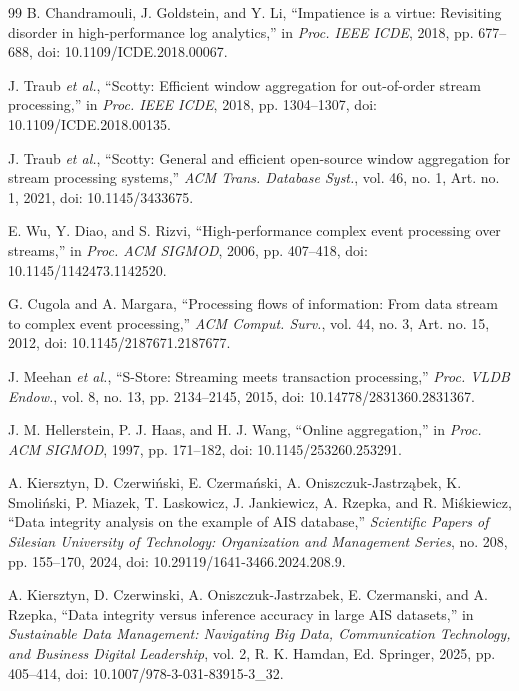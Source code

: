 \documentclass[conference]{IEEEtran}
\begin{document}
\begin{thebibliography}{99}
B. Chandramouli, J. Goldstein, and Y. Li,
``Impatience is a virtue: Revisiting disorder in high-performance log analytics,'' in \emph{Proc. IEEE ICDE}, 2018, pp. 677--688, doi: 10.1109/ICDE.2018.00067.

J. Traub \emph{et al.}, ``Scotty: Efficient window aggregation for out-of-order stream processing,'' in \emph{Proc. IEEE ICDE}, 2018, pp. 1304--1307, doi: 10.1109/ICDE.2018.00135.

J. Traub \emph{et al.}, ``Scotty: General and efficient open-source window aggregation for stream processing systems,'' \emph{ACM Trans. Database Syst.}, vol. 46, no. 1, Art. no. 1, 2021, doi: 10.1145/3433675.

E. Wu, Y. Diao, and S. Rizvi, ``High-performance complex event processing over streams,'' in \emph{Proc. ACM SIGMOD}, 2006, pp. 407--418, doi: 10.1145/1142473.1142520.

G. Cugola and A. Margara, ``Processing flows of information: From data stream to complex event processing,'' \emph{ACM Comput. Surv.}, vol. 44, no. 3, Art. no. 15, 2012, doi: 10.1145/2187671.2187677.

J. Meehan \emph{et al.}, ``S-Store: Streaming meets transaction processing,'' \emph{Proc. VLDB Endow.}, vol. 8, no. 13, pp. 2134--2145, 2015, doi: 10.14778/2831360.2831367.

J. M. Hellerstein, P. J. Haas, and H. J. Wang, ``Online aggregation,'' in \emph{Proc. ACM SIGMOD}, 1997, pp. 171--182, doi: 10.1145/253260.253291.

A. Kiersztyn, D. Czerwi{\'n}ski, E. Czerma{\'n}ski, A. Oniszczuk-Jastrz{\k{a}}bek, K. Smoli{\'n}ski, P. Miazek, T. Laskowicz, J. Jankiewicz, A. Rzepka, and R. Mi{\'s}kiewicz,
``Data integrity analysis on the example of AIS database,'' \emph{Scientific Papers of Silesian University of Technology: Organization and Management Series}, no. 208, pp. 155--170, 2024, doi: 10.29119/1641-3466.2024.208.9.

A. Kiersztyn, D. Czerwinski, A. Oniszczuk-Jastrzabek, E. Czermanski, and A. Rzepka,
``Data integrity versus inference accuracy in large AIS datasets,'' in \emph{Sustainable Data Management: Navigating Big Data, Communication Technology, and Business Digital Leadership}, vol. 2, R. K. Hamdan, Ed. Springer, 2025, pp. 405--414, doi: 10.1007/978-3-031-83915-3\_32.


\end{thebibliography}
\end{document}
